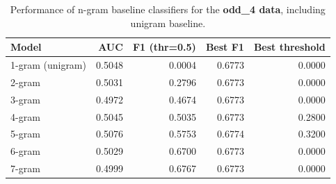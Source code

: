 \begin{table}
\caption{Performance of n-gram baseline classifiers for the \textbf{odd_4 data}, including unigram baseline.}
\label{tab:ngram_baselines}
\begin{tabular}{lrrrr}
\toprule
Model & AUC & F1 (thr=0.5) & Best F1 & Best threshold \\
\midrule
1-gram (unigram) & 0.5048 & 0.0004 & 0.6773 & 0.0000 \\
2-gram & 0.5031 & 0.2796 & 0.6773 & 0.0000 \\
3-gram & 0.4972 & 0.4674 & 0.6773 & 0.0000 \\
4-gram & 0.5045 & 0.5035 & 0.6773 & 0.2800 \\
5-gram & 0.5076 & 0.5753 & 0.6774 & 0.3200 \\
6-gram & 0.5029 & 0.6700 & 0.6773 & 0.0000 \\
7-gram & 0.4999 & 0.6767 & 0.6773 & 0.0000 \\
\bottomrule
\end{tabular}
\end{table}

